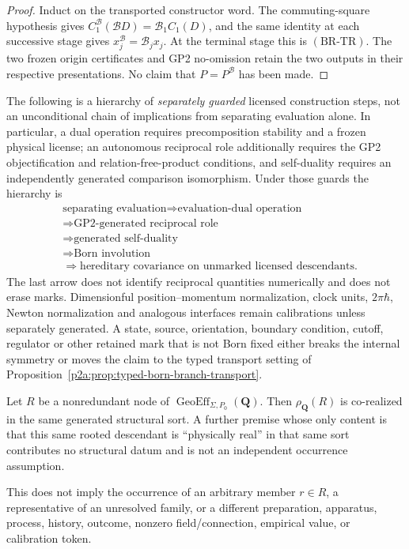 \documentclass[12pt,a4paper]{article}
\begin{document}
\begin{proof}
Induct on the transported constructor word.  The commuting-square hypothesis
gives
\(C_1^{\mathcal B}(\mathcal BD)=\mathcal B_1C_1(D)\), and the same identity
at each successive stage gives
\(x_j^{\mathcal B}=\mathcal B_jx_j\).  At the terminal stage this is
\((\mathrm{BR\text{-}TR})\).  The two frozen origin certificates and GP2
no-omission retain the two outputs in their respective presentations.  No
claim that \(P=P^{\mathcal B}\) has been made.
\end{proof}

\begin{remark}
\label{p2a:rem:reciprocity-hierarchy-and-scope}
The following is a hierarchy of \emph{separately guarded} licensed
construction steps, not an unconditional chain of implications from
separating evaluation alone.  In particular, a dual operation requires
precomposition stability and a frozen physical license; an autonomous
reciprocal role additionally requires the GP2 objectification and
relation-free-product conditions, and self-duality requires an independently
generated comparison isomorphism.  Under those guards the hierarchy is
\[
 \boxed{\begin{aligned}
  &\text{separating evaluation}
    \Rightarrow\text{evaluation-dual operation}\\
  &\Rightarrow\text{GP2-generated reciprocal role}\\
  &\Rightarrow\text{generated self-duality}\\
  &\Rightarrow\text{Born involution}\\
  &\Rightarrow\text{hereditary covariance on unmarked licensed descendants}.
 \end{aligned}}
\]
The last arrow does not identify reciprocal quantities numerically and does
not erase marks.  Dimensionful position--momentum normalization, clock units,
\(2\pi\hbar\), Newton normalization and analogous interfaces remain
calibrations unless separately generated.  A state, source, orientation,
boundary condition, cutoff, regulator or other retained mark that is not Born
fixed either breaks the internal symmetry or moves the claim to the typed
transport setting of Proposition~\ref{p2a:prop:typed-born-branch-transport}.
\end{remark}

\begin{corollary}
\label{p2a:cor:generated-structural-manifestation}
Let \(R\) be a nonredundant node of
\(\operatorname{GeoEff}_{\Sigma,P_0}(\mathbf Q)\).  Then
\(\rho_{\mathbf Q}(R)\) is co-realized in the same generated structural sort.
A further premise whose only content is that this same rooted descendant is
``physically real'' in that same sort contributes no structural datum and is
not an independent occurrence assumption.

This does not imply the occurrence of an arbitrary member \(r\in R\), a
representative of an unresolved family, or a different preparation, apparatus,
process, history, outcome, nonzero field/connection, empirical value, or
calibration token.
\end{corollary}
\end{document}
